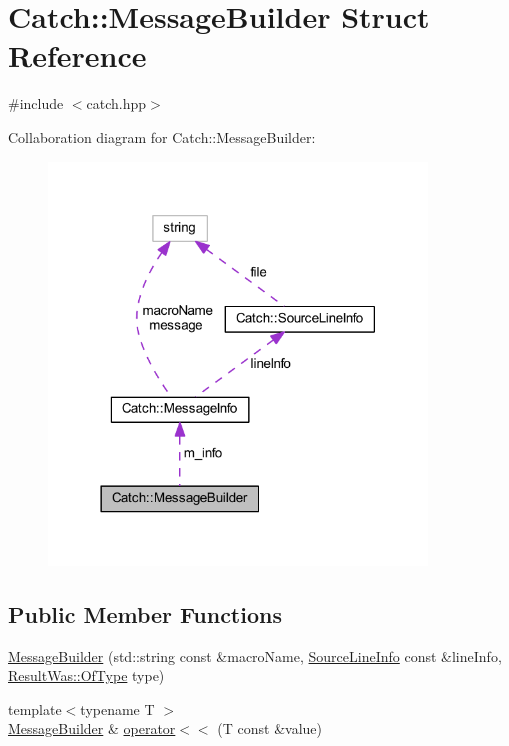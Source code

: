 \hypertarget{struct_catch_1_1_message_builder}{}\section{Catch\+:\+:Message\+Builder Struct Reference}
\label{struct_catch_1_1_message_builder}


{\ttfamily \#include $<$catch.\+hpp$>$}



Collaboration diagram for Catch\+:\+:Message\+Builder\+:\nopagebreak
\begin{figure}[H]
\begin{center}
\leavevmode
\includegraphics[width=285pt]{struct_catch_1_1_message_builder__coll__graph}
\end{center}
\end{figure}
\subsection*{Public Member Functions}
\begin{DoxyCompactItemize}
\item 
\hyperlink{struct_catch_1_1_message_builder_ab0c6378e722680bf58852c6ee2b6e724}{Message\+Builder} (std\+::string const \&macro\+Name, \hyperlink{struct_catch_1_1_source_line_info}{Source\+Line\+Info} const \&line\+Info, \hyperlink{struct_catch_1_1_result_was_a624e1ee3661fcf6094ceef1f654601ef}{Result\+Was\+::\+Of\+Type} type)
\item 
{\footnotesize template$<$typename T $>$ }\\\hyperlink{struct_catch_1_1_message_builder}{Message\+Builder} \& \hyperlink{struct_catch_1_1_message_builder_a20fa48d069b20dddcc2d3df8abb123c1}{operator$<$$<$} (T const \&value)
\end{DoxyCompactItemize}
